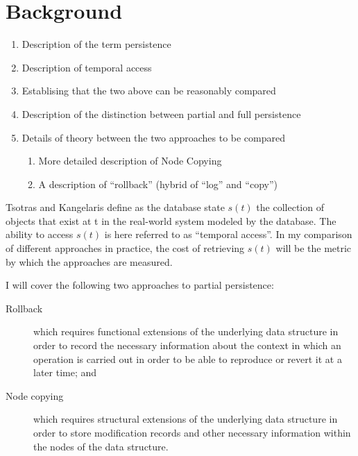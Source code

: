 \chapter{Background}

\begin{enumerate}
  \item Description of the term persistence
  \item Description of temporal access
  \item Establising that the two above can be reasonably compared
  \item Description of the distinction between partial and full persistence
  \item Details of theory between the two approaches to be compared
  \begin{enumerate}
    \item More detailed description of Node Copying
    \item A description of ``rollback'' (hybrid of ``log'' and ``copy'')
  \end{enumerate}
\end{enumerate}

Tsotras and Kangelaris \cite{Tsotras1995237} define as the database state $s(t)$
the collection of objects that exist at t in the real-world system modeled by
the database. The ability to access $s(t)$ is here referred to as ``temporal
access''. In my comparison of different approaches in practice, the cost of
retrieving $s(t)$ will be the metric by which the approaches are measured.

I will cover the following two approaches to partial persistence:
\begin{description}
  \item[Rollback] which requires functional extensions of the underlying data
  structure in order to record the necessary information about the context in
  which an operation is carried out in order to be able to reproduce or revert
  it at a later time; and
  \item[Node copying] which requires structural extensions of the underlying
  data structure in order to store modification records and other necessary
  information within the nodes of the data structure.
\end{description}
